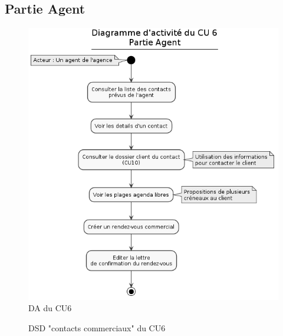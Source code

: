 \subsection{Partie Agent}
\begin{figure}[H]
\centering
\includegraphics[width=\textwidth]{figures/DA_CU6_partieAgent.png}
\caption{DA du CU6}
\end{figure}

\begin{figure}[H]
\noindent{}
\caption{DSD "contacts commerciaux" du CU6}
\end{figure}

